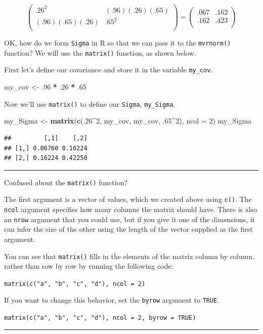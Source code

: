 \documentclass[]{book}
\newenvironment{Shaded}{\begin{snugshade}}{\end{snugshade}}
\newcommand{\DataTypeTok}[1]{\textcolor[rgb]{0.13,0.29,0.53}{#1}}
\newcommand{\DecValTok}[1]{\textcolor[rgb]{0.00,0.00,0.81}{#1}}
\newcommand{\FloatTok}[1]{\textcolor[rgb]{0.00,0.00,0.81}{#1}}
\newcommand{\KeywordTok}[1]{\textcolor[rgb]{0.13,0.29,0.53}{\textbf{#1}}}
\newcommand{\NormalTok}[1]{#1}
\newcommand{\OperatorTok}[1]{\textcolor[rgb]{0.81,0.36,0.00}{\textbf{#1}}}
\newcommand{\StringTok}[1]{\textcolor[rgb]{0.31,0.60,0.02}{#1}}
\newenvironment{info}{\hrule}{\hrule}
\begin{document}
\[
\begin{pmatrix}
.26^2 & (.96)(.26)(.65) \\
(.96)(.65)(.26) & .65^2 \\
\end{pmatrix} =
\begin{pmatrix}
.067 & .162 \\
.162 & .423 \\
\end{pmatrix}
\]

OK, how do we form \texttt{Sigma} in R so that we can pass it to the \texttt{mvrnorm()} function? We will use the \texttt{matrix()} function, as shown below.

First let's define our covariance and store it in the variable \texttt{my\_cov}.

\begin{Shaded}
\begin{Highlighting}[]
\NormalTok{my_cov <-}\StringTok{ }\FloatTok{.96} \OperatorTok{*}\StringTok{ }\FloatTok{.26} \OperatorTok{*}\StringTok{ }\FloatTok{.65}
\end{Highlighting}
\end{Shaded}

Now we'll use \texttt{matrix()} to define our \texttt{Sigma}, \texttt{my\_Sigma}.

\begin{Shaded}
\begin{Highlighting}[]
\NormalTok{my_Sigma <-}\StringTok{ }\KeywordTok{matrix}\NormalTok{(}\KeywordTok{c}\NormalTok{(.}\DecValTok{26}\OperatorTok{^}\DecValTok{2}\NormalTok{, my_cov, my_cov, }\FloatTok{.65}\OperatorTok{^}\DecValTok{2}\NormalTok{), }\DataTypeTok{ncol =} \DecValTok{2}\NormalTok{)}
\NormalTok{my_Sigma}
\end{Highlighting}
\end{Shaded}

\begin{verbatim}
##         [,1]    [,2]
## [1,] 0.06760 0.16224
## [2,] 0.16224 0.42250
\end{verbatim}

\begin{info}
Confused about the \texttt{matrix()} function?

The first argument is a vector of values, which we created above using
\texttt{c()}. The \texttt{ncol} argument specifies how many columns the
matrix should have. There is also an \texttt{nrow} argument that you
could use, but if you give it one of the dimensions, it can infer the
size of the other using the length of the vector supplied as the first
argument.

You can see that \texttt{matrix()} fills in the elements of the matrix
column by column, rather than row by row by running the following code:

\texttt{matrix(c("a",\ "b",\ "c",\ "d"),\ ncol\ =\ 2)}

If you want to change this behavior, set the \texttt{byrow} argument to
\texttt{TRUE}.

\texttt{matrix(c("a",\ "b",\ "c",\ "d"),\ ncol\ =\ 2,\ byrow\ =\ TRUE)}
\end{info}
\end{document}
